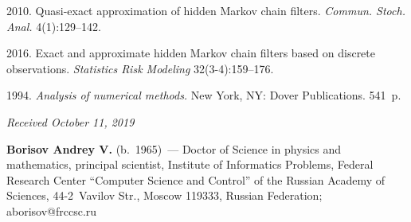 \begin{multicols}{2}
{{\begin{thebibliography}{9}
 2010.
Quasi-exact approximation of hidden Markov chain filters.
\textit{Commun. Stoch. Anal.} 4(1):129--142.

 2016. 
Exact and approximate hidden Markov chain filters based on discrete observations.
\textit{Statistics Risk Modeling} 32(3-4):159--176.

 1994.
\textit{Analysis of numerical methods.} New York, NY: Dover Publications.
541~p.
\end{thebibliography}

 }
 }

\end{multicols}


\hfill{\small\textit{Received October 11, 2019}}




\Contrl


\noindent
\textbf{Borisov Andrey V.} (b.\ 1965)~--- Doctor of Science in physics and 
 mathematics, principal scientist, Institute of Informatics Problems, 
 Federal Research Center ``Computer Science and Control'' of the Russian 
 Academy of Sciences, 44-2~Vavilov Str., Moscow 119333, Russian 
 Federation; \mbox{aborisov@frccsc.ru}
\label{end\stat}

\renewcommand{\bibname}{\protect\rm Литература} 